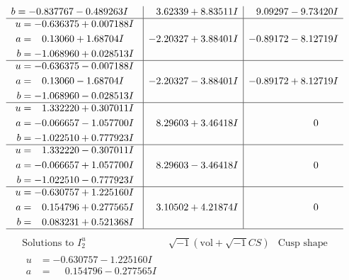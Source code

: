 \documentclass[1p]{elsarticle_modified}
\theoremstyle{definition}
\newcommand{\I}{\sqrt{-1}}
\begin{document}
$$\begin{array}{c|c|c}
\begin{aligned}
b &= -0.837767 - 0.489263 I\end{aligned}
 & \phantom{-}3.62339 + 8.83511 I & \phantom{-}9.09297 - 9.73420 I \\ \hline\begin{aligned}
u &= -0.636375 + 0.007188 I \\
a &= \phantom{-}0.13060 + 1.68704 I \\
b &= -1.068960 + 0.028513 I\end{aligned}
 & -2.20327 + 3.88401 I & -0.89172 - 8.12719 I \\ \hline\begin{aligned}
u &= -0.636375 - 0.007188 I \\
a &= \phantom{-}0.13060 - 1.68704 I \\
b &= -1.068960 - 0.028513 I\end{aligned}
 & -2.20327 - 3.88401 I & -0.89172 + 8.12719 I \\ \hline\begin{aligned}
u &= \phantom{-}1.332220 + 0.307011 I \\
a &= -0.066657 - 1.057700 I \\
b &= -1.022510 + 0.777923 I\end{aligned}
 & \phantom{-}8.29603 + 3.46418 I & \phantom{-0.000000 } 0 \\ \hline\begin{aligned}
u &= \phantom{-}1.332220 - 0.307011 I \\
a &= -0.066657 + 1.057700 I \\
b &= -1.022510 - 0.777923 I\end{aligned}
 & \phantom{-}8.29603 - 3.46418 I & \phantom{-0.000000 } 0 \\ \hline\begin{aligned}
u &= -0.630757 + 1.225160 I \\
a &= \phantom{-}0.154796 + 0.277565 I \\
b &= \phantom{-}0.083231 + 0.521368 I\end{aligned}
 & \phantom{-}3.10502 + 4.21874 I & \phantom{-0.000000 } 0\\
 \hline 
 \end{array}$$\newpage$$\begin{array}{c|c|c}  
\text{Solutions to }I^u_{2}& \I (\text{vol} + \sqrt{-1}CS) & \text{Cusp shape}\\
 \hline 
\begin{aligned}
u &= -0.630757 - 1.225160 I \\
a &= \phantom{-}0.154796 - 0.277565 I \\

\end{aligned}
\end{array}$$
\end{document}
